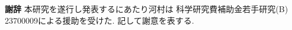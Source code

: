 \bigbreak

\noindent\textbf{謝辞}\hspace{1zw}%
本研究を遂行し発表するにあたり河村は
科学研究費補助金若手研究(B)\,23700009による援助を受けた. 
記して謝意を表する. 

